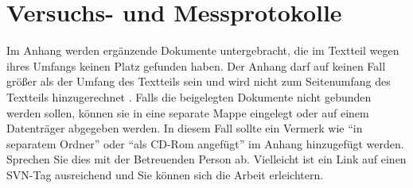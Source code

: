 
\chapter{Versuchs- und Messprotokolle}
\label{cha:AnhangA}

Im Anhang werden ergänzende Dokumente untergebracht, die im Textteil wegen ihres Umfangs keinen Platz gefunden haben.
Der Anhang darf auf keinen Fall größer als der Umfang des Textteils sein und wird nicht zum Seitenumfang des Textteils hinzugerechnet \cite[S.~198~f.]{Balz2008}.
Falls die beigelegten Dokumente nicht gebunden werden sollen, können sie in eine separate Mappe eingelegt oder auf einem Datenträger abgegeben werden.
In diesem Fall sollte ein Vermerk wie "`in separatem Ordner"' oder "`als CD-Rom angefügt"' im Anhang hinzugefügt werden. Sprechen Sie dies mit der Betreuenden Person ab. Vielleicht ist ein Link auf einen SVN-Tag ausreichend und Sie können sich die Arbeit erleichtern.


